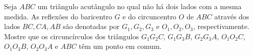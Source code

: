 Seja $ABC$ um triângulo acutângulo no qual não há dois lados com a mesma medida. As reflexões do baricentro $G$ e do circuncentro $O$ de $ABC$ através dos lados $BC, CA, AB$ são denotadas por $G_1, G_2, G_3$ e $O_1, O_2, O_3$, respectivamente. Mostre que os circuncírculos dos triângulos $G_1G_2C$, $G_1G_3B$, $G_2G_3A$, $O_1O_2C$, $O_1O_3B$, $O_2O_3A$ e $ABC$ têm um ponto em comum.
